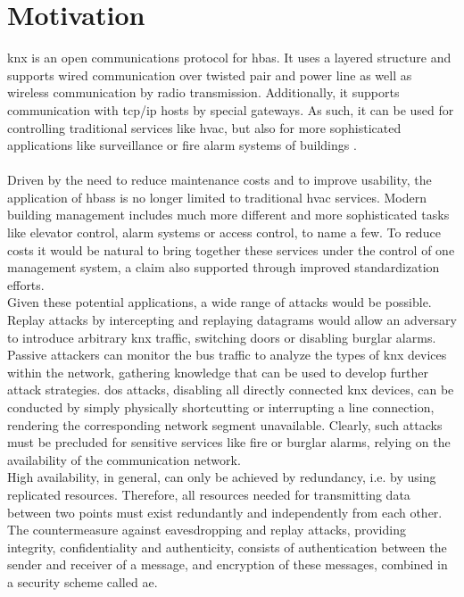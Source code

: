 \section{Motivation}

\gls{knx} is an open communications protocol for \gls{hbas}.
It uses a layered structure and supports wired communication over twisted pair
and power line as well as wireless communication by radio transmission. 
Additionally, it supports communication with \gls{tcp}/\gls{ip} hosts by special gateways. 
As such, it can be used for controlling traditional services like \gls{hvac}, but also for more
sophisticated applications like surveillance or fire alarm systems of buildings \cite{knxapps}.
\\
\\
Driven by the need to reduce maintenance costs and to improve usability, the application of \glspl{hbas} is no longer limited to traditional \gls{hvac} services.
Modern building management includes much more different and more sophisticated tasks like elevator control, alarm systems or access control, to name a few.
To reduce costs it would be natural to bring together these services under the control of one management system, a claim also supported through improved 
standardization efforts.
\\
Given these potential applications, a wide range of attacks would be possible. 
Replay attacks by intercepting and replaying datagrams would allow an adversary to introduce arbitrary \gls{knx} traffic, switching doors
or disabling burglar alarms. Passive attackers can monitor the bus traffic to analyze the types of \gls{knx} devices within the network, gathering knowledge that can be used
to develop further attack strategies.
\gls{dos} attacks, disabling all directly connected \gls{knx} devices, can be conducted by simply physically shortcutting or interrupting a line
connection, rendering the corresponding network segment unavailable. Clearly, such attacks must be precluded for sensitive services like fire or burglar alarms,
relying on the availability of the communication network.
\\
High availability, in general, can only be achieved by redundancy, i.e. by using replicated resources. Therefore, all
resources needed for transmitting data between two points must exist redundantly and independently from each other.
\\
The countermeasure against eavesdropping and replay attacks, providing integrity, confidentiality and authenticity, consists of authentication
between the sender and receiver of a message, and encryption of these messages, combined in a security scheme called \gls{ae}.
